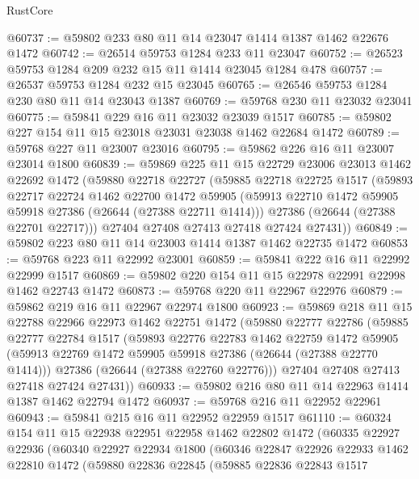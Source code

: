 \begin{lexlean}{RustCore}
\begin{coremodule}
@60737 := @59802 @233 @80 @11 @14 @23047 @1414 @1387 @1462 @22676 @1472
@60742 := @26514 @59753 @1284 @233 @11 @23047
@60752 := @26523 @59753 @1284 @209 @232 @15 @11 @1414 @23045 @1284 @478
@60757 := @26537 @59753 @1284 @232 @15 @23045
@60765 := @26546 @59753 @1284 @230 @80 @11 @14 @23043 @1387
@60769 := @59768 @230 @11 @23032 @23041
@60775 := @59841 @229 @16 @11 @23032 @23039 @1517
@60785 := @59802 @227 @154 @11 @15 @23018 @23031 @23038 @1462 @22684 @1472
@60789 := @59768 @227 @11 @23007 @23016
@60795 := @59862 @226 @16 @11 @23007 @23014 @1800
@60839 := @59869
    @225
    @11
    @15
    @22729
    @23006
    @23013
    @1462
    @22692
    @1472
    (@59880
      @22718
      @22727
      (@59885
        @22718
        @22725
        @1517
        (@59893
          @22717
          @22724
          @1462
          @22700
          @1472
          @59905
          (@59913 @22710 @1472 @59905 @59918 @27386 (@26644 (@27388 @22711 @1414)))
          @27386
          (@26644 (@27388 @22701 @22717)))
        @27404
        @27408
        @27413
        @27418
        @27424
        @27431))
@60849 := @59802 @223 @80 @11 @14 @23003 @1414 @1387 @1462 @22735 @1472
@60853 := @59768 @223 @11 @22992 @23001
@60859 := @59841 @222 @16 @11 @22992 @22999 @1517
@60869 := @59802 @220 @154 @11 @15 @22978 @22991 @22998 @1462 @22743 @1472
@60873 := @59768 @220 @11 @22967 @22976
@60879 := @59862 @219 @16 @11 @22967 @22974 @1800
@60923 := @59869
    @218
    @11
    @15
    @22788
    @22966
    @22973
    @1462
    @22751
    @1472
    (@59880
      @22777
      @22786
      (@59885
        @22777
        @22784
        @1517
        (@59893
          @22776
          @22783
          @1462
          @22759
          @1472
          @59905
          (@59913 @22769 @1472 @59905 @59918 @27386 (@26644 (@27388 @22770 @1414)))
          @27386
          (@26644 (@27388 @22760 @22776)))
        @27404
        @27408
        @27413
        @27418
        @27424
        @27431))
@60933 := @59802 @216 @80 @11 @14 @22963 @1414 @1387 @1462 @22794 @1472
@60937 := @59768 @216 @11 @22952 @22961
@60943 := @59841 @215 @16 @11 @22952 @22959 @1517
@61110 := @60324
    @154
    @11
    @15
    @22938
    @22951
    @22958
    @1462
    @22802
    @1472
    (@60335
      @22927
      @22936
      (@60340
        @22927
        @22934
        @1800
        (@60346
          @22847
          @22926
          @22933
          @1462
          @22810
          @1472
          (@59880
            @22836
            @22845
            (@59885
              @22836
              @22843
              @1517

\end{coremodule}
\end{lexlean}
